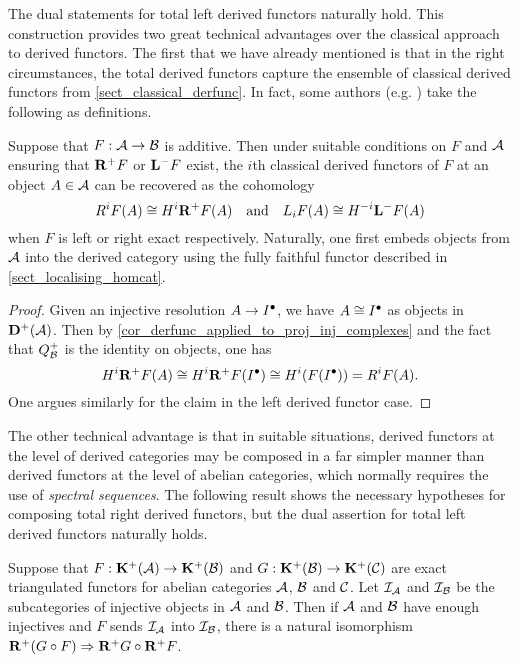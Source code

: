 The dual statements for total left derived functors naturally hold.
This construction provides two great technical advantages over the
classical approach to derived functors.
The first that we have already mentioned is that in the right
circumstances, the total derived functors capture the ensemble of
classical derived functors from \cref{sect_classical_derfunc}.
In fact, some authors (e.g. \cite{huybrechts}) take the following as
definitions.

\begin{proposition}
  \label{prop_cohomology_of_totderfunc}
  Suppose that $F: \abcat{A} \to \abcat{B}$ is additive.
  Then under suitable conditions on $F$ and $\abcat{A}$ ensuring that
  $\rightderfunc[+]{F}$ or $\leftderfunc[-]{F}$ exist, the $i$th
  classical derived functors of $F$ at an object $A \in \abcat{A}$
  can be recovered as the cohomology
  \[
    R^iF(A) \cong H^i \rightderfunc[+]{F}(A)
    \mathand
    L_iF(A) \cong H^{-i} \leftderfunc[-]{F}(A)
  \]
  when $F$ is left or right exact respectively.
  Naturally, one first embeds objects from $\abcat{A}$ into the
  derived category using the fully faithful functor described in
  \cref{sect_localising_homcat}.
\end{proposition}

\begin{proof}
  Given an injective resolution $A \to \cochaincomp{I}$, we have $A
  \cong \cochaincomp{I}$ as objects in ${\dercat[+]{\abcat{A}}}$.
  Then by \cref{cor_derfunc_applied_to_proj_inj_complexes} and the
  fact that $\dercatlocln[+]{\abcat{B}}$ is the identity on objects, one has
  \[
    H^i \rightderfunc[+]{F}(A)
    \cong H^i \rightderfunc[+]{F}(\cochaincomp{I})
    \cong H^i (F(\cochaincomp{I}))
    = R^i F(A).
  \]
  One argues similarly for the claim in the left derived functor case.
\end{proof}

The other technical advantage is that in suitable situations, derived
functors at the level of derived categories may be composed in a far
simpler manner than derived functors at the level of abelian
categories, which normally requires the use of \emph{spectral sequences}.
The following result shows the necessary hypotheses for composing
total right derived functors, but the dual assertion for total left
derived functors naturally holds.

\begin{proposition}
  \label{prop_total_derfunc_comp}
  Suppose that $F: \homcat[+]{\abcat{A}} \to \homcat[+]{\abcat{B}}$
  and $G: \homcat[+]{\abcat{B}} \to \homcat[+]{\abcat{C}}$ are exact
  triangulated functors for abelian categories $\abcat{A}$,
  $\abcat{B}$ and $\abcat{C}$.
  Let $\cat{I}_{\abcat{A}}$ and $\cat{I}_{\abcat{B}}$ be the
  subcategories of injective objects in $\abcat{A}$ and $\abcat{B}$.
  Then if $\abcat{A}$ and $\abcat{B}$ have enough injectives and $F$
  sends $\abcat{I}_{\abcat{A}}$ into $\cat{I}_{\abcat{B}}$, there is
  a natural isomorphism $\rightderfunc[+](G \circ F) \nattrans
  \rightderfunc[+]{G} \circ \rightderfunc[+]{F}$.
\end{proposition}

